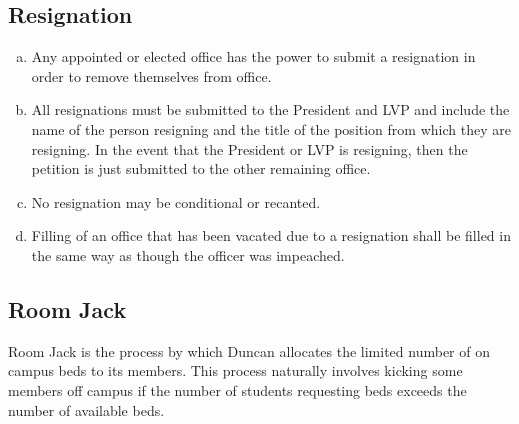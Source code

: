 \documentclass[USletter,12pt]{article}
\begin{document}
\subsection{Resignation}


\begin{enumerate}[(a)]
\item Any appointed or elected office has the power to submit a resignation in order to remove themselves from office.
\item All resignations must be submitted to the President and LVP and include the name of the person resigning and the title of the position from which they are resigning.  In the event that the President or LVP is resigning, then the petition is just submitted to the other remaining office.
\item No resignation may be conditional or recanted.
\item Filling of an office that has been vacated due to a resignation shall be filled in the same way as though the officer was impeached.
\end{enumerate}


\subsection{Room Jack}

Room Jack is the process by which Duncan allocates the limited number of on campus beds to its members.  This process naturally involves kicking some members off campus if the number of students requesting beds exceeds the number of available beds.
\end{document}
